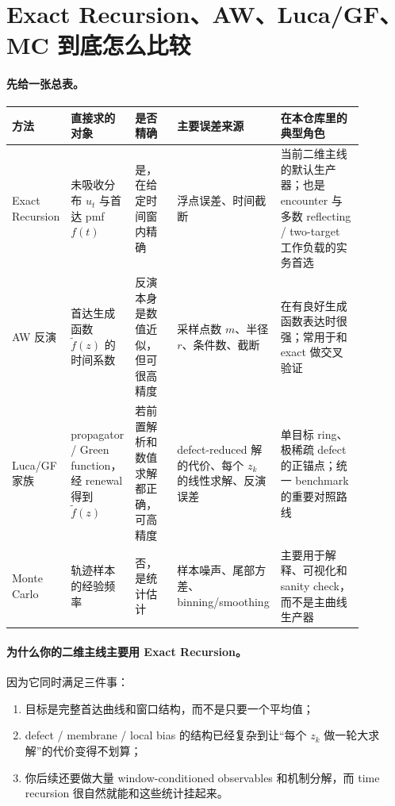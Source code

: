 \documentclass[11pt,fontset=fandol]{ctexart}
\begin{document}
\section{Exact Recursion、AW、Luca/GF、MC 到底怎么比较}
\paragraph{先给一张总表。}
\small
\setlength{\LTleft}{0pt}
\setlength{\LTright}{0pt}
\begin{longtable}{>{\raggedright\arraybackslash}p{0.14\linewidth} >{\raggedright\arraybackslash}p{0.14\linewidth} >{\raggedright\arraybackslash}p{0.14\linewidth} >{\raggedright\arraybackslash}p{0.18\linewidth} >{\raggedright\arraybackslash}p{0.28\linewidth}}
\toprule
方法 & 直接求的对象 & 是否精确 & 主要误差来源 & 在本仓库里的典型角色 \\
\midrule
\endhead
Exact Recursion & 未吸收分布 $u_t$ 与首达 pmf $f(t)$ & 是，在给定时间窗内精确 & 浮点误差、时间截断 & 当前二维主线的默认生产器；也是 encounter 与多数 reflecting / two-target 工作负载的实务首选 \\
AW 反演 & 首达生成函数 $\widetilde f(z)$ 的时间系数 & 反演本身是数值近似，但可很高精度 & 采样点数 $m$、半径 $r$、条件数、截断 & 在有良好生成函数表达时很强；常用于和 exact 做交叉验证 \\
Luca/GF 家族 & propagator / Green function，经 renewal 得到 $\widetilde f(z)$ & 若前置解析和数值求解都正确，可高精度 & defect-reduced 解的代价、每个 $z_k$ 的线性求解、反演误差 & 单目标 ring、极稀疏 defect 的正锚点；统一 benchmark 的重要对照路线 \\
Monte Carlo & 轨迹样本的经验频率 & 否，是统计估计 & 样本噪声、尾部方差、binning/smoothing & 主要用于解释、可视化和 sanity check，而不是主曲线生产器 \\
\bottomrule
\end{longtable}
\normalsize

\paragraph{为什么你的二维主线主要用 Exact Recursion。}
因为它同时满足三件事：
\begin{enumerate}
  \item 目标是完整首达曲线和窗口结构，而不是只要一个平均值；
  \item defect / membrane / local bias 的结构已经复杂到让“每个 $z_k$ 做一轮大求解”的代价变得不划算；
  \item 你后续还要做大量 window-conditioned observables 和机制分解，而 time recursion 很自然就能和这些统计挂起来。
\end{enumerate}
\end{document}
